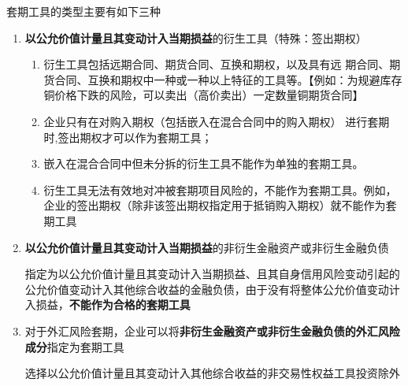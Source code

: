 \documentclass[UTF8,12pt]{ctexart}
\numberwithin{equation}{section} %
\numberwithin{figure}{section}
\numberwithin{table}{section}
\begin{document}
	套期工具的类型主要有如下三种
	\begin{enumerate}
		\item \textbf{以公允价值计量且其变动计入当期损益}的衍生工具（特殊：签出期权）
		\begin{enumerate}
			\item 衍生工具包括远期合同、期货合同、互换和期权，以及具有远 期合同、期货合同、互换和期权中一种或一种以上特征的工具等。【例如：为规避库存铜价格下跌的风险，可以卖出（高价卖出）一定数量铜期货合同】
			
			\item 企业只有在对购入期权（包括嵌入在混合合同中的购入期权） 进行套期时,签出期权才可以作为套期工具；
			
			\item 嵌入在混合合同中但未分拆的衍生工具不能作为单独的套期工具。
			
			\item 衍生工具无法有效地对冲被套期项目风险的，不能作为套期工具。例如，企业的签出期权（除非该签出期权指定用于抵销购入期权）就不能作为套期工具
			
		\end{enumerate}
		
		\item \textbf{以公允价值计量且其变动计入当期损益}的非衍生金融资产或非衍生金融负债
		
		指定为以公允价值计量且其变动计入当期损益、且其自身信用风险变动引起的公允价值变动计入其他综合收益的金融负债，由于没有将整体公允价值变动计入损益，\textbf{不能作为合格的套期工具}
		
		\item 对于外汇风险套期，企业可以将\textbf{非衍生金融资产或非衍生金融负债的外汇风险成分}指定为套期工具
		
		选择以公允价值计量且其变动计入其他综合收益的非交易性权益工具投资除外
		
	\end{enumerate}
\end{document}
